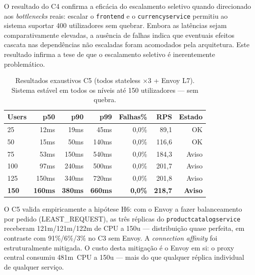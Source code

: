 \documentclass[manuscript,screen,review]{acmart}
\begin{document}
O resultado do C4 confirma a eficácia do escalamento seletivo quando direcionado aos \textit{bottlenecks} reais: escalar o \texttt{frontend} e o \texttt{currencyservice} permitiu ao sistema suportar 400 utilizadores sem quebrar. Embora as latências sejam comparativamente elevadas, a ausência de falhas indica que eventuais efeitos cascata nas dependências não escaladas foram acomodados pela arquitetura. Este resultado infirma a tese de que o escalamento seletivo é inerentemente problemático.

\begin{table}[t]
\caption{Resultados exaustivos C5 (todos stateless ×3 + Envoy L7). Sistema estável em todos os níveis até 150 utilizadores — sem quebra.}
\label{tab:c5ex}
\begin{tabular}{lrrrrrr}
\toprule
\textbf{Users} & \textbf{p50} & \textbf{p90} & \textbf{p99} & \textbf{Falhas\%} & \textbf{RPS} & \textbf{Estado} \\
\midrule
25  & 12ms  & 19ms  & 45ms  & 0,0\% & 89,1  & OK \\
50  & 15ms  & 50ms  & 140ms & 0,0\% & 116,6 & OK \\
75  & 53ms  & 150ms & 540ms & 0,0\% & 184,3 & Aviso \\
100 & 97ms  & 240ms & 500ms & 0,0\% & 201,7 & Aviso \\
125 & 150ms & 340ms & 720ms & 0,0\% & 201,8 & Aviso \\
\textbf{150} & \textbf{160ms} & \textbf{380ms} & \textbf{660ms} & \textbf{0,0\%} & \textbf{218,7} & \textbf{Aviso} \\
\bottomrule
\end{tabular}
\end{table}

O C5 valida empiricamente a hipótese H6: com o Envoy a fazer balanceamento por pedido (LEAST\_REQUEST), as três réplicas do \texttt{productcatalogservice} receberam 121m/121m/122m de CPU a 150u — distribuição quase perfeita, em contraste com 91\%/6\%/3\% no C3 sem Envoy. A \textit{connection affinity} foi estruturalmente mitigada. O custo desta mitigação é o Envoy em si: o proxy central consumiu 481m~CPU a 150u — mais do que qualquer réplica individual de qualquer serviço.
\end{document}

